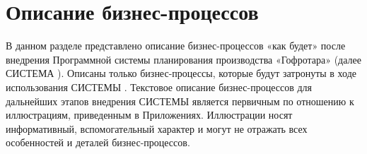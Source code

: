 
\newpage
\section{Описание бизнес-процессов}

В данном разделе представлено описание бизнес-процессов «как будет» после внедрения Программной системы планирования производства «Гофротара» (далее СИСТЕМА \gofro). Описаны только бизнес-процессы, которые будут затронуты в ходе использования СИСТЕМЫ \gofro. Текстовое описание бизнес-процессов для дальнейших этапов внедрения СИСТЕМЫ \gofro является первичным по отношению к иллюстрациям, приведенным в Приложениях. Иллюстрации носят информативный, вспомогательный характер и могут не отражать всех особенностей и деталей бизнес-процессов. 







